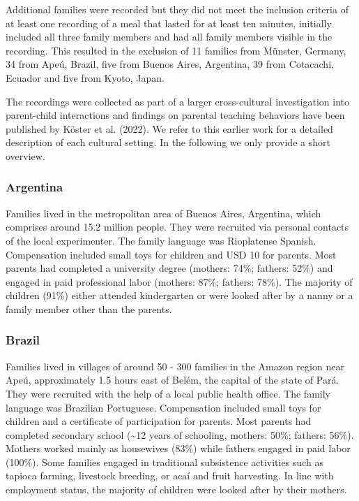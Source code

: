 \documentclass[
  man,floatsintext]{apa6}
\begin{document}
Additional families were recorded but they did not meet the inclusion criteria of at least one recording of a meal that lasted for at least ten minutes, initially included all three family members and had all family members visible in the recording. This resulted in the exclusion of 11 families from Münster, Germany, 34 from Apeú, Brazil, five from Buenos Aires, Argentina, 39 from Cotacachi, Ecuador and five from Kyoto, Japan.

The recordings were collected as part of a larger cross-cultural investigation into parent-child interactions and findings on parental teaching behaviors have been published by Köster et al. (2022). We refer to this earlier work for a detailed description of each cultural setting. In the following we only provide a short overview.

\hypertarget{argentina}{%
\subsubsection{Argentina}\label{argentina}}

Families lived in the metropolitan area of Buenos Aires, Argentina, which comprises around 15.2 million people. They were recruited via personal contacts of the local experimenter. The family language was Rioplatense Spanish. Compensation included small toys for children and USD 10 for parents. Most parents had completed a university degree (mothers: 74\%; fathers: 52\%) and engaged in paid professional labor (mothers: 87\%; fathers: 78\%). The majority of children (91\%) either attended kindergarten or were looked after by a nanny or a family member other than the parents.

\hypertarget{brazil}{%
\subsubsection{Brazil}\label{brazil}}

Families lived in villages of around 50 - 300 families in the Amazon region near Apeú, approximately 1.5 hours east of Belém, the capital of the state of Pará. They were recruited with the help of a local public health office. The family language was Brazilian Portuguese. Compensation included small toys for children and a certificate of participation for parents. Most parents had completed secondary school (\textasciitilde12 years of schooling, mothers: 50\%; fathers: 56\%). Mothers worked mainly as housewives (83\%) while fathers engaged in paid labor (100\%). Some families engaged in traditional subsistence activities such as tapioca farming, livestock breeding, or acaí and fruit harvesting. In line with employment status, the majority of children were looked after by their mothers.
\end{document}
